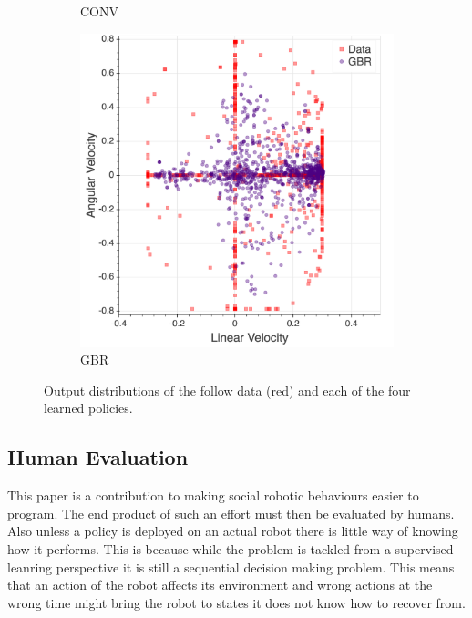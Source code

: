 \documentclass[letterpaper, 10 pt, conference]{ieeeconf}
\begin{document}
\begin{figure}[tbh]
\begin{subfigure}[b]{0.45\columnwidth}
    \caption{CONV}
    \label{fig:data3}
  \end{subfigure}
  \hspace{5mm}
  \begin{subfigure}[b]{0.45\columnwidth}
    \includegraphics[scale = 0.09]{images/gbr_dist.png}

    \caption{GBR}
       \label{fig:data4}
  \end{subfigure} 
  \caption{Output distributions of the follow data (red) and each of the four learned policies.}

    \vspace{-2mm}
  \label{fig:data}
  \end{figure}


\subsection{Human Evaluation}
This paper is a contribution to making social robotic behaviours easier to program. The end product of such an effort must then be evaluated by humans. Also unless a policy is deployed on an actual robot there is little way of knowing how it performs. This is because while the problem is tackled from a supervised leanring perspective it is still a sequential decision making problem. This means that an action of the robot affects its environment and wrong actions at the wrong time might bring the robot to states it does not know how to recover from.
\end{document}
